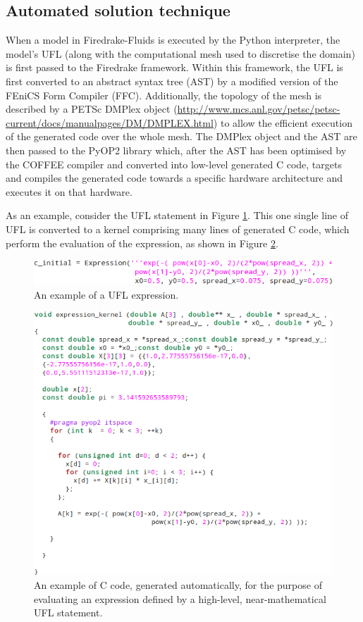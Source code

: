 \documentclass[a4paper,11pt]{report}
\begin{document}
\subsection{Automated solution technique}
When a model in Firedrake-Fluids is executed by the Python interpreter, the model's UFL (along with the computational mesh used to discretise the domain) is first passed to the Firedrake framework. Within this framework, the UFL is first converted to an abstract syntax tree (AST) by a modified version of the FEniCS Form Compiler (FFC). Additionally, the topology of the mesh is described by a PETSc DMPlex object (\url{http://www.mcs.anl.gov/petsc/petsc-current/docs/manualpages/DM/DMPLEX.html}) to allow the efficient execution of the generated code over the whole mesh. The DMPlex object and the AST are then passed to the PyOP2 library \citep{Rathgeber_etal_2012, Markall_etal_2013} which, after the AST has been optimised by the COFFEE compiler and converted into low-level generated C code, targets and compiles the generated code towards a specific hardware architecture and executes it on that hardware.

As an example, consider the UFL statement in Figure \ref{fig:ufl_expression}. This one single line of UFL is converted to a kernel comprising many lines of generated C code, which perform the evaluation of the expression, as shown in Figure \ref{fig:c_kernel}.

\begin{figure}
   \centering
   \includegraphics[width=0.75\columnwidth]{images/ufl_expression.png}
   \caption{An example of a UFL expression.}
   \label{fig:ufl_expression}
\end{figure}

\begin{figure}
   \centering
   \includegraphics[width=0.75\columnwidth]{images/c_kernel.png}
   \caption{An example of C code, generated automatically, for the purpose of evaluating an expression defined by a high-level, near-mathematical UFL statement.}
   \label{fig:c_kernel}
\end{figure}
\end{document}
